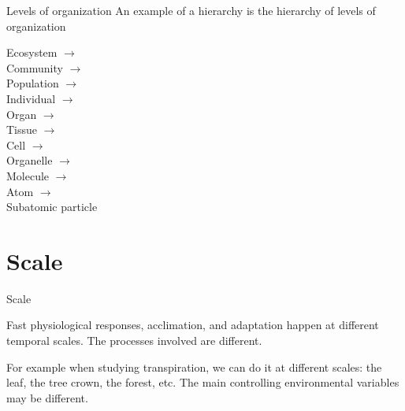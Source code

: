 \documentclass[10pt]{beamer}
\begin{document}
\begin{frame}{Levels of organization}
An example of a hierarchy is the hierarchy of levels of organization

Ecosystem $\rightarrow$\\
\hspace{.5cm}Community $\rightarrow$\\
\hspace{1cm}Population $\rightarrow$\\
\hspace{1.5cm}Individual $\rightarrow$\\
\hspace{2cm}Organ $\rightarrow$\\
\hspace{2.5cm}Tissue $\rightarrow$\\
\hspace{3cm}Cell $\rightarrow$\\
\hspace{3.5cm}Organelle $\rightarrow$\\
\hspace{4cm}Molecule $\rightarrow$\\
\hspace{4.5cm}Atom $\rightarrow$\\
\hspace{5cm}Subatomic particle

\end{frame}

\section{Scale}

\begin{frame}{Scale}
    \begin{description}[type=1]
        \item[Temporal scale]<1> Fast physiological
        responses, acclimation, and adaptation happen at
        different temporal scales. The processes involved are
        different.
        \item[Spatial scale]<2> For example when
        studying transpiration, we can do it at different
        scales: the leaf, the tree crown, the forest, etc.
        The main controlling environmental variables may
        be different.
    \end{description}
\end{frame}
\end{document}
